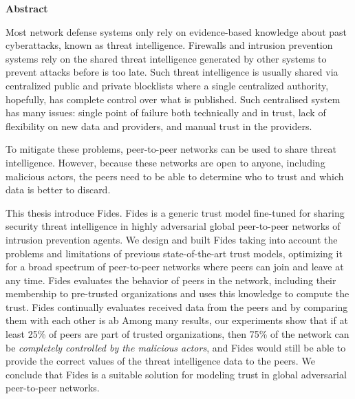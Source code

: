 \newenvironment{abstractpage}
  {\cleardoublepage\thispagestyle{empty}}
  {\vfill\cleardoublepage}
\newenvironment{abstract}[1]
  {\bigskip
   \begin{center}\bfseries#1\end{center}\small\leftskip=0.5cm\rightskip=0.5cm}
  {\par\bigskip}

\providecommand{\keywords}[2]{\footnotesize\textbf{\textit{#1:}} #2}

\begin{abstractpage}
\begin{abstract}{Abstract}

Most network defense systems only rely on evidence-based knowledge about past cyberattacks, known as threat intelligence. Firewalls and intrusion prevention systems rely on the shared threat intelligence generated by other systems to prevent attacks before is too late.
Such threat intelligence is usually shared via centralized public and private blocklists where a single centralized authority, hopefully, has complete control over what is published. Such centralised system has many issues: single point of failure both technically and in trust, lack of flexibility on new data and providers, and manual trust in the providers.

To mitigate these problems, peer-to-peer networks can be used to share threat intelligence. However, because these networks are open to anyone, including malicious actors, the peers need to be able to determine who to trust and which data is better to discard.

This thesis introduce Fides. Fides is a generic trust model fine-tuned for sharing security threat intelligence in highly adversarial global peer-to-peer networks of intrusion prevention agents.
We design and built Fides taking into account the problems and limitations of previous state-of-the-art trust models, optimizing it for a broad spectrum of peer-to-peer networks where peers can join and leave at any time.
Fides evaluates the behavior of peers in the network, including their membership to pre-trusted organizations and uses this knowledge to compute the trust.
Fides continually evaluates received data from the peers and by comparing them with each other is ab
Among many results, our experiments show that if at least 25\% of peers are part of trusted organizations, then 75\% of the network can be \textit{completely controlled by the malicious actors}, and Fides would still be able to provide the correct values of the threat intelligence data to the peers. We conclude that Fides is a suitable solution for modeling trust in global adversarial peer-to-peer networks. 


\end{abstract}
\end{abstractpage}
